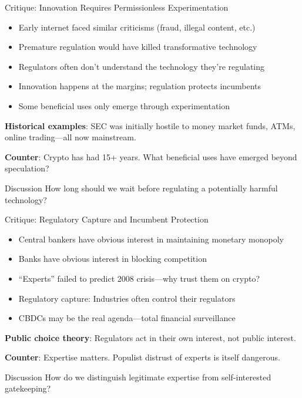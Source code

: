 ﻿\documentclass[aspectratio=169,11pt]{beamer}
\begin{document}
\begin{frame}{Critique: Innovation Requires Permissionless Experimentation}
\begin{objectionbox}
\begin{itemize}
    \item Early internet faced similar criticisms (fraud, illegal content, etc.)
    \item Premature regulation would have killed transformative technology
    \item Regulators often don't understand the technology they're regulating
    \item Innovation happens at the margins; regulation protects incumbents
    \item Some beneficial uses only emerge through experimentation
\end{itemize}
\end{objectionbox}

\vspace{0.3em}
\textbf{Historical examples}: SEC was initially hostile to money market funds, ATMs, online trading---all now mainstream.

\textbf{Counter}: Crypto has had 15+ years. What beneficial uses have emerged beyond speculation?

\begin{alertblock}{Discussion}
How long should we wait before regulating a potentially harmful technology?
\end{alertblock}
\end{frame}

\begin{frame}{Critique: Regulatory Capture and Incumbent Protection}
\begin{objectionbox}
\begin{itemize}
    \item Central bankers have obvious interest in maintaining monetary monopoly
    \item Banks have obvious interest in blocking competition
    \item ``Experts'' failed to predict 2008 crisis---why trust them on crypto?
    \item Regulatory capture: Industries often control their regulators
    \item CBDCs may be the real agenda---total financial surveillance
\end{itemize}
\end{objectionbox}

\vspace{0.3em}
\textbf{Public choice theory}: Regulators act in their own interest, not public interest.

\textbf{Counter}: Expertise matters. Populist distrust of experts is itself dangerous.

\begin{alertblock}{Discussion}
How do we distinguish legitimate expertise from self-interested gatekeeping?
\end{alertblock}
\end{frame}
\end{document}
